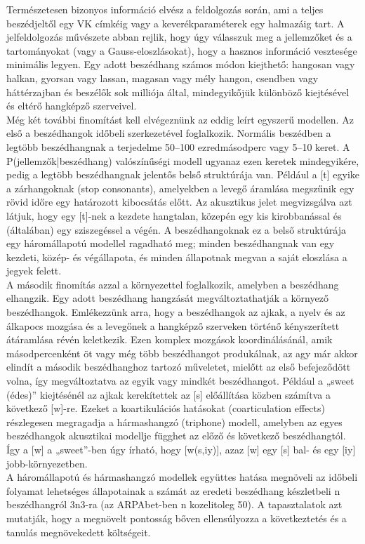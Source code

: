 \documentclass[a4paper,12pt]{paper}
\begin{document}
Természetesen bizonyos információ elvész a feldolgozás során, ami a teljes beszédjeltől egy VK címkéig vagy a keverékparaméterek egy halmazáig tart. A jelfeldolgozás művészete abban rejlik, hogy úgy válasszuk meg a jellemzőket és a tartományokat (vagy a Gauss-eloszlásokat), hogy a hasznos információ vesztesége minimális legyen. Egy adott beszédhang számos módon kiejthető: hangosan vagy halkan, gyorsan vagy lassan, magasan vagy mély hangon, csendben vagy háttérzajban és beszélők sok milliója által, mindegyikőjük különböző kiejtésével és eltérő hangképző szerveivel.
\\Még két további finomítást kell elvégeznünk az eddig leírt egyszerű modellen. Az első a beszédhangok időbeli szerkezetével foglalkozik. Normális beszédben a legtöbb beszédhangnak a terjedelme 50–100 ezredmásodperc vagy 5–10 keret. A P(jellemzők|beszédhang) valószínűségi modell ugyanaz ezen keretek mindegyikére, pedig a legtöbb beszédhangnak jelentős belső struktúrája van. Például a [t] egyike a zárhangoknak (stop consonants), amelyekben a levegő áramlása megszűnik egy rövid időre egy határozott kibocsátás előtt. Az akusztikus jelet megvizsgálva azt látjuk, hogy egy [t]-nek a kezdete hangtalan, közepén egy kis kirobbanással és (általában) egy sziszegéssel a végén. A beszédhangoknak ez a belső struktúrája egy háromállapotú modellel ragadható meg; minden beszédhangnak van egy kezdeti, közép- és végállapota, és minden állapotnak megvan a saját eloszlása a jegyek felett.
\\A második finomítás azzal a környezettel foglalkozik, amelyben a beszédhang elhangzik. Egy adott beszédhang hangzását megváltoztathatják a környező beszédhangok. Emlékezzünk arra, hogy a beszédhangok az ajkak, a nyelv és az álkapocs mozgása és a levegőnek a hangképző szerveken történő kényszerített átáramlása révén keletkezik. Ezen komplex mozgások koordinálásánál, amik másodpercenként öt vagy még több beszédhangot produkálnak, az agy már akkor elindít a második beszédhanghoz tartozó műveletet, mielőtt az első befejeződött volna, így megváltoztatva az egyik vagy mindkét beszédhangot. Például a „sweet (édes)” kiejtésénél az ajkak kerekítettek az [s] előállítása közben számítva a következő [w]-re. Ezeket a koartikulációs hatásokat (coarticulation effects) részlegesen megragadja a hármashangzó (triphone) modell, amelyben az egyes beszédhangok akusztikai modellje függhet az előző és következő beszédhangtól. Így a [w] a „sweet”-ben úgy írható, hogy [w(s,iy)], azaz [w] egy [s] bal- és egy [iy] jobb-környezetben.
\\ A háromállapotú és hármashangzó modellek együttes hatása megnöveli az időbeli folyamat lehetséges állapotainak a számát az eredeti beszédhang készletbeli n beszédhangról 3n3-ra (az ARPAbet-ben n kozelitoleg 50). A tapasztalatok azt mutatják, hogy a megnövelt pontosság bőven ellensúlyozza a következtetés és a tanulás megnövekedett költségeit.
\end{document}
